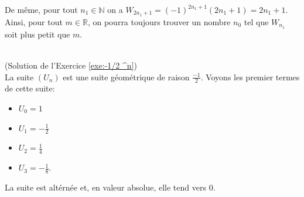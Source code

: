 \begin{corrige}
\begin{sol}
\begin{itemize}
      De m\^eme, pour tout $n_1 \in \mathbb{N}$ on a $W_{2 n_1 + 1} = (-1)^{2 n_1 + 1} (2 n_1 + 1) = 2 n_1 + 1$.
      Ainsi, pour tout $m \in \mathbb{R}$, on pourra toujours trouver un nombre $n_0$ tel que $W_{n_1}$ soit plus petit que $m$.
\end{itemize}
\end{sol}
%
\begin{sol} ~ \\
\label{sol:-1/2 ^n}
(Solution de l'Exercice \ref{exe:-1/2 ^n})\\
La suite $(U_n)$ est une suite g\'eom\'etrique de raison $\frac{-1}{2}$.
Voyons les premier termes de cette suite: 
\begin{itemize}
\item $U_0 = 1$
\item $U_1 = -\frac{1}{2}$
\item $U_2 = \frac{1}{4}$
\item $U_3 = -\frac{1}{8}$.
\end{itemize}
La suite est alt\'ern\'ee et, en valeur absolue, elle tend vers $0$.
\end{sol}
\end{corrige}

